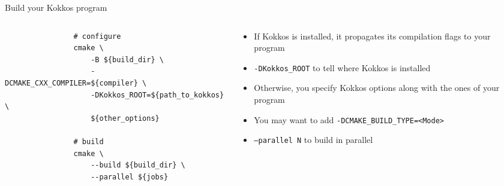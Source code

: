 \documentclass[
    aspectratio=169,
    \createHandout
]{beamer}
\begin{document}
\begin{frame}[fragile]{Build your Kokkos program}
    \begin{columns}
        \begin{column}{0.6\linewidth}
            \begin{verbatim}
                # configure
                cmake \
                    -B ${build_dir} \
                    -DCMAKE_CXX_COMPILER=${compiler} \
                    -DKokkos_ROOT=${path_to_kokkos} \
                    ${other_options}

                # build
                cmake \
                    --build ${build_dir} \
                    --parallel ${jobs}
            \end{verbatim}
        \end{column}
        \begin{column}{0.4\linewidth}
            \begin{itemize}
                \item If Kokkos is installed, it propagates its compilation flags to your program
                \item \texttt{-DKokkos\_ROOT} to tell where Kokkos is installed
                \item Otherwise, you specify Kokkos options along with the ones of your program
                \item You may want to add \texttt{-DCMAKE\_BUILD\_TYPE=<Mode>}
                \item \texttt{--parallel N} to build in parallel
            \end{itemize}
        \end{column}
    \end{columns}
\end{frame}

\end{document}

